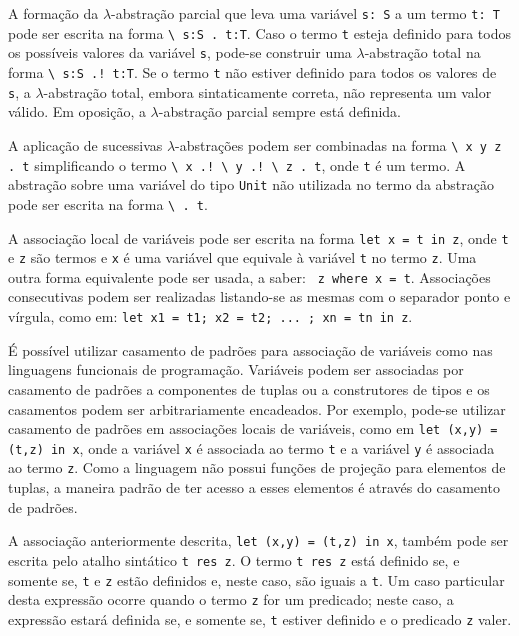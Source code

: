 A formação da $\lambda$-abstração parcial que leva uma variável \Verb.s: S. a um termo \Verb.t: T. pode ser escrita na forma \Verb_\ s:S . t:T_.
Caso o termo \Verb.t. esteja definido para todos os possíveis valores da variável \Verb.s., pode-se construir uma $\lambda$-abstração total na forma \Verb_\ s:S .! t:T_.
Se o termo \Verb.t. não estiver definido para todos os valores de \Verb.s., a $\lambda$-abstração total, embora sintaticamente correta, não representa um valor válido.
Em oposição, a $\lambda$-abstração parcial sempre está definida.

A aplicação de sucessivas $\lambda$-abstrações podem ser combinadas na forma \Verb_\ x y z . t_ simplificando o termo \Verb_\ x .! \ y .! \ z . t_, onde \Verb.t. é um termo.
A abstração sobre uma variável do tipo \Verb.Unit. não utilizada no termo da abstração pode ser escrita na forma \Verb_\ . t_.

A associação local de variáveis pode ser escrita na forma \Verb.let x = t in z., onde \Verb.t. e \Verb.z. são termos e \Verb.x. é uma variável que equivale à variável \Verb.t. no termo \Verb.z..
Uma outra forma equivalente pode ser usada, a saber: \Verb. z where x = t..
Associações consecutivas podem ser realizadas listando-se as mesmas com o separador ponto e vírgula, como em: \Verb_let x1 = t1; x2 = t2; ... ; xn = tn in z_.

É possível utilizar casamento de padrões para associação de variáveis como nas linguagens funcionais de programação.
Variáveis podem ser associadas por casamento de padrões a componentes de tuplas ou a construtores de tipos e os casamentos podem ser arbitrariamente encadeados.
Por exemplo, pode-se utilizar casamento de padrões em associações locais de variáveis, como em \Verb_let (x,y) = (t,z) in x_, onde a variável \Verb.x. é associada ao termo \Verb.t. e a variável \Verb.y. é associada ao termo \Verb.z..
Como a linguagem não possui funções de projeção para elementos de tuplas, a maneira padrão de ter acesso a esses elementos é através do casamento de padrões.

A associação anteriormente descrita, \Verb_let (x,y) = (t,z) in x_, também pode ser escrita pelo atalho sintático \Verb.t res z..
O termo \Verb.t res z. está definido se, e somente se, \Verb.t. e \Verb.z. estão definidos e, neste caso, são iguais a \Verb.t..
Um caso particular desta expressão ocorre quando o termo \Verb.z. for um predicado; neste caso, a expressão estará definida se, e somente se, \Verb.t. estiver definido e o predicado \Verb.z. valer.

